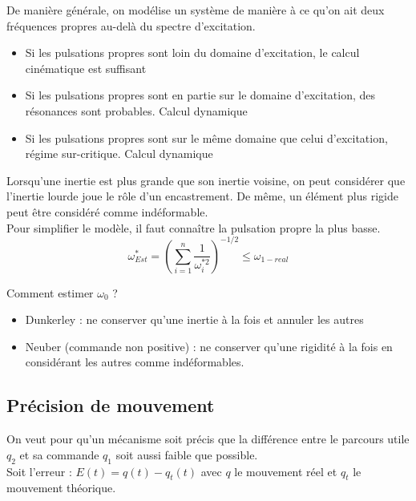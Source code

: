 \documentclass[../main.tex]{subfiles}
\begin{document}
De manière générale, on modélise un système de manière à ce qu'on ait deux fréquences propres au-delà du spectre d'excitation. \\
\begin{itemize}
    \item Si les pulsations propres sont loin du domaine d'excitation, le calcul cinématique est suffisant\\
    \item Si les pulsations propres sont en partie sur le domaine d'excitation, des résonances sont probables. Calcul dynamique\\
    \item Si les pulsations propres sont sur le même domaine que celui d'excitation, régime sur-critique. Calcul dynamique\\
\end{itemize}

\warning Lorsqu'une inertie est plus grande que son inertie voisine, on peut considérer que l'inertie lourde joue le rôle d'un encastrement. De même, un élément plus rigide peut être considéré comme indéformable. \\

Pour simplifier le modèle, il faut connaître la pulsation propre la plus basse. \begin{equation}
    \omega_{Est}^* = (\sum_{i=1}^n \frac{1}{\omega_i^{*2}})^{-1/2} \leq \omega_{1-real}
\end{equation}

Comment estimer $\omega_0$ ? \begin{itemize}
    \item Dunkerley : ne conserver qu'une inertie à la fois et annuler les autres\\
    \item Neuber (commande non positive) : ne conserver qu'une rigidité à la fois en considérant les autres comme indéformables.\\
\end{itemize}

\subsection{Précision de mouvement}
On veut pour qu'un mécanisme soit précis que la différence entre le parcours utile $q_2$ et sa commande $q_1$ soit aussi faible que possible.\\

Soit l'erreur : $E(t) = q(t) - q_t(t)$ avec $q$ le mouvement réel et $q_t$ le mouvement théorique.\\
\end{document}
